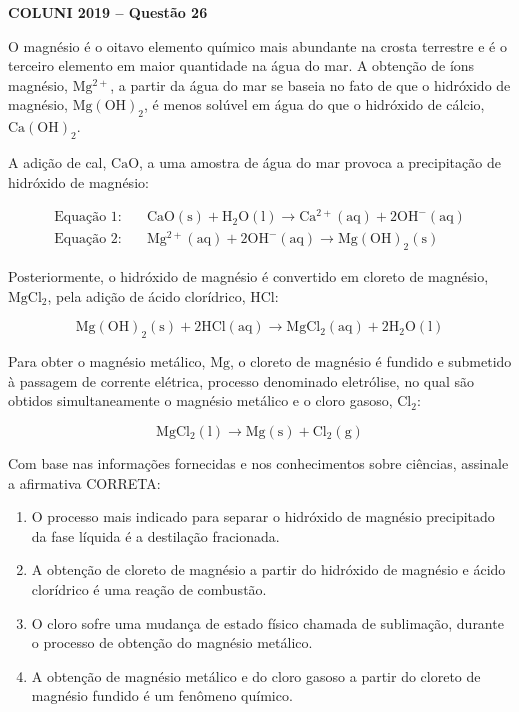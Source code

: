 \textbf{COLUNI 2019 -- Questão 26}\par\medskip O magnésio é o oitavo elemento químico mais abundante na crosta terrestre e é o terceiro elemento em maior quantidade na água do mar. A obtenção de íons magnésio, $\mathrm{Mg^{2+}}$, a partir da água do mar se baseia no fato de que o hidróxido de magnésio, $\mathrm{Mg(OH)_2}$, é menos solúvel em água do que o hidróxido de cálcio, $\mathrm{Ca(OH)_2}$.

\par

A adição de cal, $\mathrm{CaO}$, a uma amostra de água do mar provoca a precipitação de hidróxido de magnésio:

\begin{align*}
\text{Equação 1:}\quad & \mathrm{CaO(s) + H_2O(l) \longrightarrow Ca^{2+}(aq) + 2OH^{-}(aq)}\\
\text{Equação 2:}\quad & \mathrm{Mg^{2+}(aq) + 2OH^{-}(aq) \longrightarrow Mg(OH)_2(s)}
\end{align*}

\par

Posteriormente, o hidróxido de magnésio é convertido em cloreto de magnésio, $\mathrm{MgCl_2}$, pela adição de ácido clorídrico, HCl:

\par

\[\mathrm{Mg(OH)_2(s) + 2HCl(aq) \longrightarrow MgCl_2(aq) + 2H_2O(l)}\]

\par

Para obter o magnésio metálico, $\mathrm{Mg}$, o cloreto de magnésio é fundido e submetido à passagem de corrente elétrica, processo denominado eletrólise, no qual são obtidos simultaneamente o magnésio metálico e o cloro gasoso, $\mathrm{Cl_2}$:

\par

\[\mathrm{MgCl_2(l) \longrightarrow Mg(s) + Cl_2(g)}\]

\par

Com base nas informações fornecidas e nos conhecimentos sobre ciências, assinale a afirmativa CORRETA:\begin{enumerate}
\item O processo mais indicado para separar o hidróxido de magnésio precipitado da fase líquida é a destilação
      fracionada.
\item A obtenção de cloreto de magnésio a partir do hidróxido de magnésio e ácido clorídrico é uma reação de
      combustão.
\item O cloro sofre uma mudança de estado físico chamada de sublimação, durante o processo de obtenção do
      magnésio metálico.
\item A obtenção de magnésio metálico e do cloro gasoso a partir do cloreto de magnésio fundido é um
      fenômeno químico.\end{enumerate}
